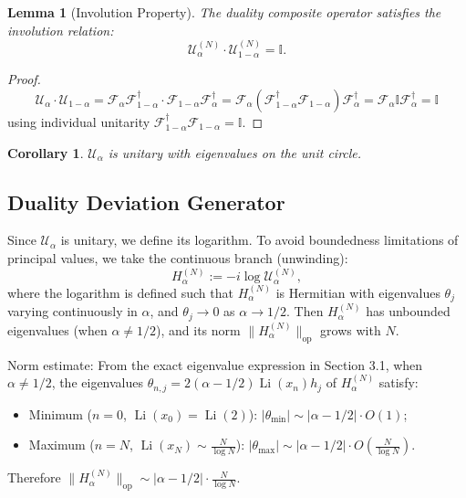 \documentclass[12pt,a4paper]{amsart}
\theoremstyle{plain}
\newtheorem{lemma}[theorem]{Lemma}
\newtheorem{corollary}[theorem]{Corollary}
\theoremstyle{definition}
\theoremstyle{remark}
\DeclareMathOperator{\Li}{Li}
\begin{document}
\begin{lemma}[Involution Property]\label{lem:involution}
The duality composite operator satisfies the involution relation:
\begin{equation}
\mathcal{U}_\alpha^{(N)} \cdot \mathcal{U}_{1-\alpha}^{(N)} = \mathbb{I}.
\end{equation}
\end{lemma}

\begin{proof}
\begin{equation}
\mathcal{U}_\alpha \cdot \mathcal{U}_{1-\alpha} = \mathcal{F}_\alpha \mathcal{F}_{1-\alpha}^\dagger \cdot \mathcal{F}_{1-\alpha} \mathcal{F}_\alpha^\dagger = \mathcal{F}_\alpha (\mathcal{F}_{1-\alpha}^\dagger \mathcal{F}_{1-\alpha}) \mathcal{F}_\alpha^\dagger = \mathcal{F}_\alpha \mathbb{I} \mathcal{F}_\alpha^\dagger = \mathbb{I}
\end{equation}
using individual unitarity $\mathcal{F}_{1-\alpha}^\dagger \mathcal{F}_{1-\alpha} = \mathbb{I}$.
\end{proof}

\begin{corollary}
$\mathcal{U}_\alpha$ is unitary with eigenvalues on the unit circle.
\end{corollary}

\subsection{Duality Deviation Generator}

Since $\mathcal{U}_\alpha$ is unitary, we define its logarithm. To avoid boundedness limitations of principal values, we take the continuous branch (unwinding):
\begin{equation}
H_\alpha^{(N)} := -i \log \mathcal{U}_\alpha^{(N)},
\end{equation}
where the logarithm is defined such that $H_\alpha^{(N)}$ is Hermitian with eigenvalues $\theta_j$ varying continuously in $\alpha$, and $\theta_j \to 0$ as $\alpha \to 1/2$. Then $H_\alpha^{(N)}$ has unbounded eigenvalues (when $\alpha \neq 1/2$), and its norm $\|H_\alpha^{(N)}\|_{\mathrm{op}}$ grows with $N$.

Norm estimate: From the exact eigenvalue expression in Section 3.1, when $\alpha \neq 1/2$, the eigenvalues $\theta_{n,j} = 2(\alpha-1/2)\Li(x_n)h_j$ of $H_\alpha^{(N)}$ satisfy:
\begin{itemize}
    \item Minimum ($n=0$, $\Li(x_0)=\Li(2)$): $|\theta_{\min}| \sim |\alpha-1/2| \cdot O(1)$;
    \item Maximum ($n=N$, $\Li(x_N) \sim \frac{N}{\log N}$): $|\theta_{\max}| \sim |\alpha-1/2| \cdot O(\frac{N}{\log N})$.
\end{itemize}
Therefore $\|H_\alpha^{(N)}\|_{\mathrm{op}} \sim |\alpha-1/2| \cdot \frac{N}{\log N}$.
\end{document}

